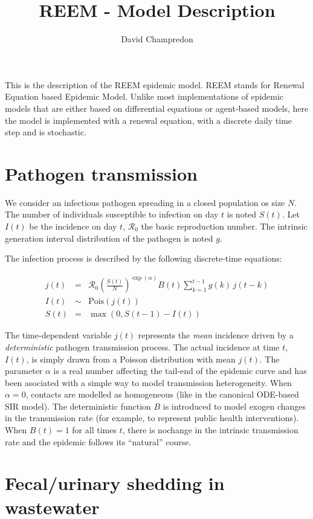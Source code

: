 \documentclass[11pt]{article} %
\title{\textsf{REEM - Model Description}}
\author{David Champredon}
\newcommand{\Ro}{\ensuremath{\mathcal{R}_0}\xspace}
\begin{document}
\maketitle


This is the description of the REEM epidemic model. REEM stands for Renewal Equation based Epidemic Model. Unlike most implementations of epidemic models that are either based on differential equations or agent-based models, here the model is implemented with a renewal equation, with a discrete daily time step and is stochastic.

\section{Pathogen transmission}

We consider an infectious pathogen spreading in a closed population os size $N$. The number of individuals susceptible to infection on day $t$ is noted $S(t)$. 
Let $I(t)$ be the incidence on day $t$, \Ro the basic reproduction number.
The intrinsic generation interval distribution of the pathogen is noted $g$. 

The infection process is described by the following discrete-time equations:

\begin{eqnarray}
j(t) & = & \Ro \left(\frac{S(t)}{N}\right)^{\exp(\alpha)} B(t) \sum_{k=1}^{t-1} g(k)\, j(t-k) \\
I(t) & \sim & \mathrm{Pois}(j(t))   \\
S(t) & = & \max(0, S(t-1) - I(t))
\end{eqnarray}

The time-dependent variable $j(t)$ represents the \emph{mean} incidence driven by a \emph{deterministic} pathogen transmission process.
The actual incidence at time $t$, $I(t)$, is simply drawn from a Poisson distribution with mean $j(t)$.
The parameter $\alpha$ is a real number affecting the tail-end of the epidemic curve and has been asociated with a simple way to model transmission heterogeneity. When $\alpha=0$, contacts are modelled as homogeneous (like in the canonical ODE-based SIR model). 
The deterministic function $B$ is introduced to model exogen changes in the transmission rate (for example, to represent public health interventions). When $B(t) = 1$ for all times $t$, there is nochange in the intrinsic transmission rate and the epidemic follows its ``natural'' course. 

\section{Fecal/urinary shedding in wastewater}
\end{document}
